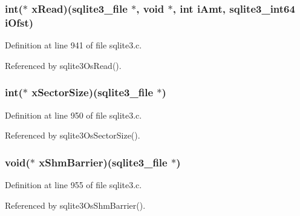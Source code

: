 \subsubsection[{x\+Read}]{\setlength{\rightskip}{0pt plus 5cm}int($\ast$ x\+Read)({\bf sqlite3\+\_\+file} $\ast$, void $\ast$, int i\+Amt, {\bf sqlite3\+\_\+int64} i\+Ofst)}\label{structsqlite3__io__methods_afd9c9bd674df251d9fc83fe3c9264e49}


Definition at line 941 of file sqlite3.\+c.



Referenced by sqlite3\+Os\+Read().

\hypertarget{structsqlite3__io__methods_a355a7a9ee3b728f7c3976130d24774bd}{}
\subsubsection[{x\+Sector\+Size}]{\setlength{\rightskip}{0pt plus 5cm}int($\ast$ x\+Sector\+Size)({\bf sqlite3\+\_\+file} $\ast$)}\label{structsqlite3__io__methods_a355a7a9ee3b728f7c3976130d24774bd}


Definition at line 950 of file sqlite3.\+c.



Referenced by sqlite3\+Os\+Sector\+Size().

\hypertarget{structsqlite3__io__methods_a4244835846045ff9b5073e0fcf801d4f}{}
\subsubsection[{x\+Shm\+Barrier}]{\setlength{\rightskip}{0pt plus 5cm}void($\ast$ x\+Shm\+Barrier)({\bf sqlite3\+\_\+file} $\ast$)}\label{structsqlite3__io__methods_a4244835846045ff9b5073e0fcf801d4f}


Definition at line 955 of file sqlite3.\+c.



Referenced by sqlite3\+Os\+Shm\+Barrier().

\hypertarget{structsqlite3__io__methods_a5e9791b765f3aa8408609e2e1dfd72ff}{}
